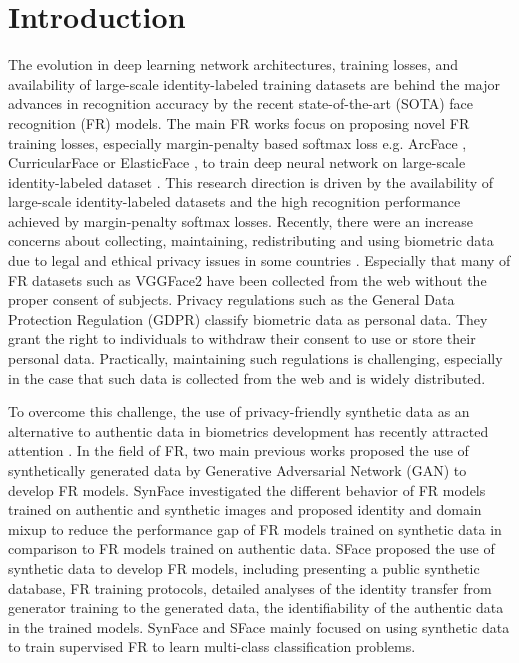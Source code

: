 \documentclass[10pt,twocolumn,letterpaper]{ieeeconf}
\begin{document}
\section{Introduction}
The evolution in deep learning network architectures, training losses, and availability of large-scale identity-labeled training datasets are behind the major advances in recognition accuracy by the recent state-of-the-art (SOTA) face recognition (FR) models.  
The main FR works focus on proposing novel FR training losses, especially margin-penalty based softmax loss e.g. ArcFace \cite{ArcFace}, CurricularFace \cite{CurricularFace} or ElasticFace \cite{ElasticFace}, to train deep neural network \cite{ResNet} on large-scale identity-labeled dataset \cite{CASIA, MS-Celeb-1M, VGGFace2}. This research direction is driven by the availability of large-scale identity-labeled datasets and the high recognition performance achieved by margin-penalty softmax losses. Recently, there were an increase concerns about collecting, maintaining, redistributing and using biometric data due to legal and ethical privacy issues in some countries \cite{DBLP:journals/tifs/MedenRTDKSRPS21,eu-2016/679}. Especially that many of FR datasets such as VGGFace2 \cite{VGGFace2} have been collected from the web without the proper consent of subjects.
Privacy regulations such as the General Data Protection Regulation (GDPR) \cite{eu-2016/679} classify biometric data as personal data. They grant the right to individuals to withdraw their consent to use or store their personal data. Practically, maintaining such regulations is challenging, especially in the case that such data is collected from the web and is widely distributed.  

To overcome this challenge, the use of privacy-friendly synthetic data as an alternative to authentic data in biometrics development has recently attracted attention \cite{DBLP:journals/ivc/BoutrosDRRKK20,quantface_boutros,DBLP:conf/cvpr/DamerLFSPB22,DBLP:conf/iccvw/DamerBKK19}.
In the field of FR, two main previous works proposed the use of synthetically generated data by Generative Adversarial Network (GAN) \cite{GAN} to develop FR models. SynFace \cite{SynFace} investigated the different behavior of FR models trained on authentic and synthetic images and proposed identity and domain mixup to reduce the performance gap of FR models trained on synthetic data in comparison to FR models trained on authentic data. SFace \cite{SFace} proposed the use of synthetic data to develop FR models, including presenting a public synthetic database, FR training protocols, detailed analyses of the identity transfer from generator training to the generated data, the identifiability of the authentic data in the trained models. SynFace \cite{SynFace} and SFace \cite{SFace} mainly focused on using synthetic data to train supervised FR to learn multi-class classification problems. 
\end{document}
